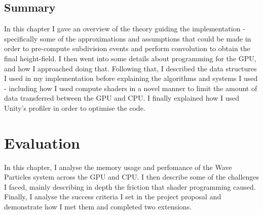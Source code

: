 \documentclass[12pt,a4paper,twoside]{report}
\begin{document}




\section{Summary}

In this chapter I gave an overview of the theory guiding the implementation -
specifically some of the approximations and assumptions that could be made in
order to pre-compute subdivision events and perform convolution to obtain the
final height-field. I then went into some details about programming for the
GPU, and how I approached doing that. Following that, I described the data
structures I used in my implementation before explaining the algorithms and
systems I used - including how I used compute shaders in a novel manner to
limit the amount of data transferred between the GPU and CPU. I finally
explained how I used Unity's profiler in order to optimise the code.

\chapter{Evaluation}

In this chapter, I analyse the memory usage and perfomance of the Wave
Particles system across the GPU and CPU. I then describe some of the challenges
I faced, mainly describing in depth the friction that shader programming
caused. Finally, I analyse the success criteria I set in the project proposal
and demonstrate how I met them and completed two extensions.
\end{document}

